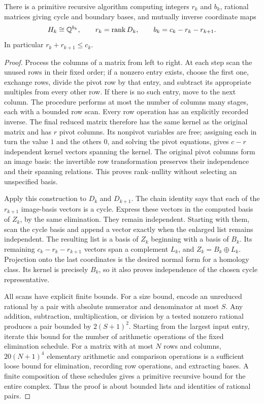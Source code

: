 \begin{proposition}
\label{prop:effective-homology}
There is a primitive recursive algorithm computing integers $r_k$ and
$b_k$, rational matrices giving cycle and boundary bases, and mutually inverse
coordinate maps
\[
 H_k\cong\mathbb Q^{b_k},\qquad
 r_k=\operatorname{rank}D_k,\qquad
 b_k=c_k-r_k-r_{k+1}.
\]
In particular $r_k+r_{k+1}\leq c_k$.
\end{proposition}
\begin{proof}
Process the columns of a matrix from left to right.  At each step scan the
unused rows in their fixed order; if a nonzero entry exists, choose the first
one, exchange rows, divide the pivot row by that entry, and subtract its
appropriate multiples from every other row.  If there is no such entry,
move to the next column.  The procedure performs at most the number of
columns many stages, each with a bounded row scan.  Every row operation has
an explicitly recorded inverse.  The final reduced matrix therefore has
the same kernel as the original matrix and has $r$ pivot columns.  Its
nonpivot variables are free; assigning each in turn the value $1$ and the
others $0$, and solving the pivot equations, gives $c-r$ independent kernel
vectors spanning the kernel.  The original pivot columns form an image
basis: the invertible row transformation preserves their independence and
their spanning relations.  This proves rank--nullity without selecting an
unspecified basis.

Apply this construction to $D_k$ and $D_{k+1}$.  The chain identity says that
each of the $r_{k+1}$ image-basis vectors is a cycle.  Express these vectors
in the computed basis of $Z_k$, by the same elimination.  They remain
independent.  Starting with them, scan the cycle basis and append a vector
exactly when the enlarged list remains independent.  The resulting list is
a basis of $Z_k$ beginning with a basis of $B_k$.  Its remaining
$c_k-r_k-r_{k+1}$ vectors span a complement $L_k$, and
$Z_k=B_k\oplus L_k$.  Projection onto the last coordinates is the desired
normal form for a homology class.  Its kernel is precisely $B_k$, so it
also proves independence of the chosen cycle representative.

All scans have explicit finite bounds.  For a size bound, encode an
unreduced rational by a pair with absolute numerator and denominator at
most $S$.  Any addition, subtraction, multiplication, or division by a
tested nonzero rational produces a pair bounded by $2(S+1)^2$.
Starting from the largest input entry, iterate this bound for the number of
arithmetic operations of the fixed elimination schedule.  For a matrix
with at most $N$ rows and columns, $20(N+1)^4$ elementary arithmetic and
comparison operations is a sufficient loose bound for elimination,
recording row operations, and extracting bases.  A finite composition of
these schedules gives a primitive recursive bound for the entire complex.
Thus the proof is about bounded lists and identities of rational pairs.
\end{proof}

